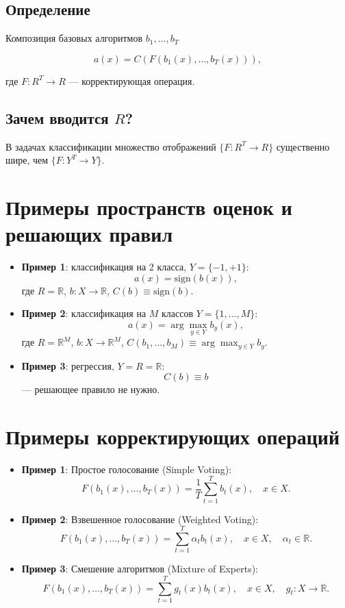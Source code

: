 \subsection*{Определение}
Композиция базовых алгоритмов $b_1, \ldots, b_T$

\[ a(x) = C(F(b_1(x), \ldots, b_T(x))), \]

где $F: R^T \rightarrow R$ — корректирующая операция.

\subsection*{Зачем вводится $R$?}
В задачах классификации множество отображений $\{F : R^T \rightarrow R\}$ существенно шире, чем $\{F : Y^T \rightarrow Y\}$.

\section*{Примеры пространств оценок и решающих правил}

\begin{itemize}
    \item \textbf{Пример 1}: классификация на 2 класса, $Y = \{-1, +1\}$:
    \[
    a(x) = \text{sign}(b(x)),
    \]
    где $R = \mathbb{R}$, $b: X \rightarrow \mathbb{R}$, $C(b) \equiv \text{sign}(b)$.
    
    \item \textbf{Пример 2}: классификация на $M$ классов $Y = \{1, \ldots, M\}$:
    \[
    a(x) = \arg \max_{y \in Y} b_y(x),
    \]
    где $R = \mathbb{R}^M$, $b: X \rightarrow \mathbb{R}^M$, $C(b_1, \ldots, b_M) \equiv \arg \max_{y \in Y} b_y$.
    
    \item \textbf{Пример 3}: регрессия, $Y = R = \mathbb{R}$:
    \[
    C(b) \equiv b
    \]
    — решающее правило не нужно.
\end{itemize}

\section*{Примеры корректирующих операций}

\begin{itemize}
    \item \textbf{Пример 1}: Простое голосование (Simple Voting):
    \[
    F(b_1(x), \ldots, b_T(x)) = \frac{1}{T} \sum_{t=1}^T b_t(x), \quad x \in X.
    \]

    \item \textbf{Пример 2}: Взвешенное голосование (Weighted Voting):
    \[
    F(b_1(x), \ldots, b_T(x)) = \sum_{t=1}^T \alpha_t b_t(x), \quad x \in X, \quad \alpha_t \in \mathbb{R}.
    \]

    \item \textbf{Пример 3}: Смешение алгоритмов (Mixture of Experts):
    \[
    F(b_1(x), \ldots, b_T(x)) = \sum_{t=1}^T g_t(x) b_t(x), \quad x \in X, \quad g_t: X \rightarrow \mathbb{R}.
    \]
\end{itemize}

